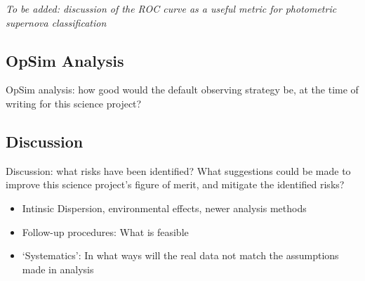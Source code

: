 \emph{To be added: discussion of the ROC curve as a useful metric for photometric supernova 
classification}


\subsection{OpSim Analysis}
\label{sec:keyword:analysis}

OpSim analysis: how good would the default observing strategy be, at
the time of writing for this science project?



\subsection{Discussion}
\label{sec:keyword:discussion}

Discussion: what risks have been identified? What suggestions could be
made to improve this science project's figure of merit, and mitigate
the identified risks?


\begin{itemize}
\item Intinsic Dispersion, environmental effects, newer analysis methods
\item Follow-up procedures: What is feasible
\item `Systematics': In what ways will the real data not match the assumptions made in analysis
\end{itemize}



\navigationbar
